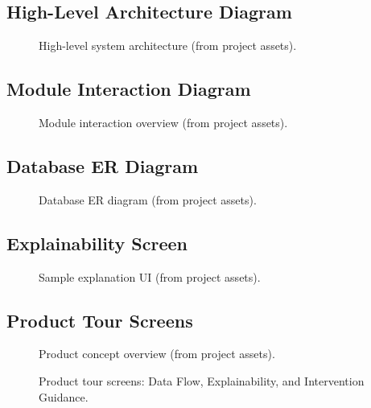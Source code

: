 \documentclass[12pt]{article}
\begin{document}
\subsection{High-Level Architecture Diagram}
\begin{figure}[H]
  \centering
  
  \caption{High-level system architecture (from project assets).}
\end{figure}

\subsection{Module Interaction Diagram}
\begin{figure}[H]
  \centering
  
  \caption{Module interaction overview (from project assets).}
\end{figure}

\subsection{Database ER Diagram}
\begin{figure}[H]
  \centering
  
  \caption{Database ER diagram (from project assets).}
\end{figure}

\subsection{Explainability Screen}
\begin{figure}[H]
  \centering
  
  \caption{Sample explanation UI (from project assets).}
\end{figure}

\subsection{Product Tour Screens}
\begin{figure}[H]
  \centering
  
  \caption{Product concept overview (from project assets).}
\end{figure}

\begin{figure}[H]
  \centering
  

  \vspace{0.6cm}
  

  \vspace{0.6cm}
  
  \caption{Product tour screens: Data Flow, Explainability, and Intervention Guidance.}
\end{figure}
\end{document}
